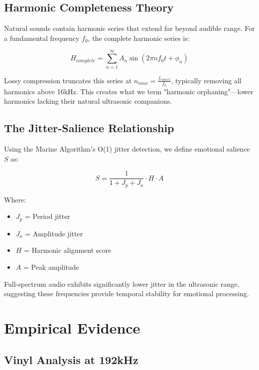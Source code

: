 \documentclass[12pt,a4paper]{article}
\begin{document}
\subsection{Harmonic Completeness Theory}

Natural sounds contain harmonic series that extend far beyond audible range. For a fundamental frequency $f_0$, the complete harmonic series is:

\begin{equation}
H_{complete} = \sum_{n=1}^{\infty} A_n \sin(2\pi n f_0 t + \phi_n)
\end{equation}

Lossy compression truncates this series at $n_{max} = \frac{f_{cutoff}}{f_0}$, typically removing all harmonics above 16kHz. This creates what we term "harmonic orphaning"—lower harmonics lacking their natural ultrasonic companions.

\subsection{The Jitter-Salience Relationship}

Using the Marine Algorithm's O(1) jitter detection, we define emotional salience $S$ as:

\begin{equation}
S = \frac{1}{1 + J_p + J_a} \cdot H \cdot A
\end{equation}

Where:
\begin{itemize}
\item $J_p$ = Period jitter
\item $J_a$ = Amplitude jitter
\item $H$ = Harmonic alignment score
\item $A$ = Peak amplitude
\end{itemize}

Full-spectrum audio exhibits significantly lower jitter in the ultrasonic range, suggesting these frequencies provide temporal stability for emotional processing.

\section{Empirical Evidence}

\subsection{Vinyl Analysis at 192kHz}
\end{document}
